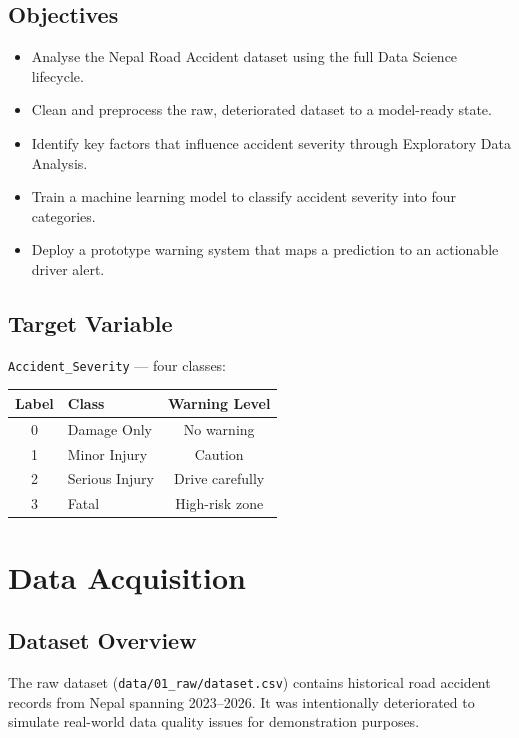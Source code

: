 \documentclass[12pt,a4paper]{article}
\begin{document}
\subsection{Objectives}
\begin{itemize}[leftmargin=1.5cm]
    \item Analyse the Nepal Road Accident dataset using the full Data Science lifecycle.
    \item Clean and preprocess the raw, deteriorated dataset to a model-ready state.
    \item Identify key factors that influence accident severity through Exploratory Data Analysis.
    \item Train a machine learning model to classify accident severity into four categories.
    \item Deploy a prototype warning system that maps a prediction to an actionable driver alert.
\end{itemize}

\subsection{Target Variable}
\texttt{Accident\_Severity} — four classes:

\begin{center}
\begin{tabular}{clc}
\toprule
\textbf{Label} & \textbf{Class} & \textbf{Warning Level} \\
\midrule
0 & Damage Only    & {\color{green!60!black} No warning} \\
1 & Minor Injury   & {\color{yellow!60!black} Caution} \\
2 & Serious Injury & {\color{orange} Drive carefully} \\
3 & Fatal          & {\color{red} High-risk zone} \\
\bottomrule
\end{tabular}
\end{center}

\section{Data Acquisition}

\subsection{Dataset Overview}
The raw dataset (\texttt{data/01\_raw/dataset.csv}) contains historical road accident records from Nepal spanning 2023–2026. It was intentionally deteriorated to simulate real-world data quality issues for demonstration purposes.
\end{document}
